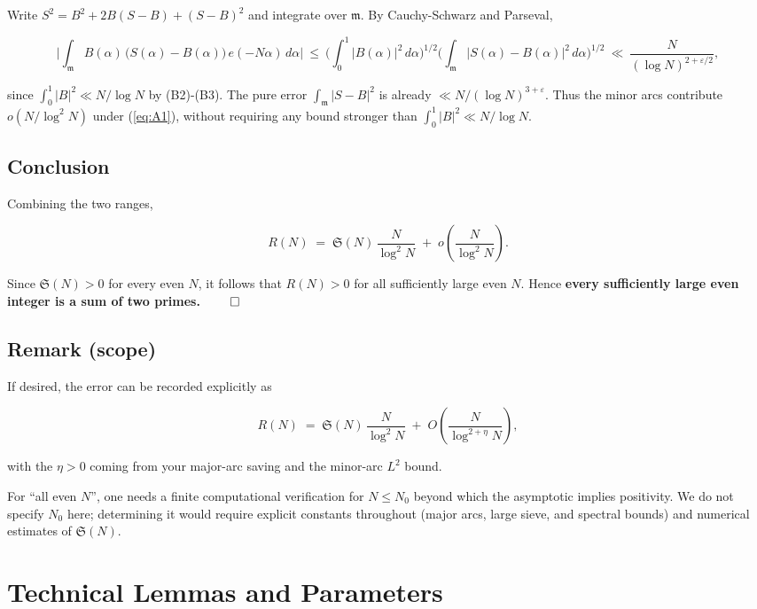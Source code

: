 \documentclass[11pt]{article}
\def\eqref#1{(\ref{#1})}%
\renewcommand{\thepart}{\Alph{part}}
\theoremstyle{definition}
\theoremstyle{remark}
\numberwithin{equation}{part}
\renewcommand{\thesection}{\thepart.\arabic{section}}
\begin{document}
Write $S^2=B^2+2B(S-B)+(S-B)^2$ and integrate over $\mathfrak m$.
By Cauchy-Schwarz and Parseval,

$$
	\Big|\int_{\mathfrak m} B(\alpha)\,\big(S(\alpha)-B(\alpha)\big)\,e(-N\alpha)\,d\alpha\Big|
	\ \le\ \Big(\int_0^1 |B(\alpha)|^2\,d\alpha\Big)^{1/2}
	\Big(\int_{\mathfrak m}|S(\alpha)-B(\alpha)|^2\,d\alpha\Big)^{1/2}
	\ \ll\ \frac{N}{(\log N)^{2+\varepsilon/2}},
$$

since $\int_0^1|B|^2\ll N/\log N$ by (B2)-(B3). The pure error $\int_{\mathfrak m}|S-B|^2$ is already $\ll N/(\log N)^{3+\varepsilon}$. Thus the minor arcs contribute $o\!\left(N/\log^2 N\right)$ under \eqref{eq:A1}, without requiring any bound stronger than $\int_0^1|B|^2\ll N/\log N$.

\subsection{Conclusion}

Combining the two ranges,

$$
	R(N)
	\;=\;\mathfrak S(N)\,\frac{N}{\log^2 N}\;+\;o\!\left(\frac{N}{\log^2 N}\right).
$$

Since $\mathfrak S(N)>0$ for every even $N$, it follows that $R(N)>0$ for all sufficiently large even $N$. Hence \textbf{every sufficiently large even integer is a sum of two primes.} $\qed$

\subsection{Remark (scope)}
If desired, the error can be recorded explicitly as

$$
	R(N)\;=\;\mathfrak S(N)\,\frac{N}{\log^2 N}\;+\;O\!\left(\frac{N}{\log^{2+\eta}N}\right),
$$

with the $\eta>0$ coming from your major-arc saving and the minor-arc $L^2$ bound.

For “all even $N$”, one needs a finite computational verification for $N\le N_0$ beyond which the asymptotic implies positivity. We do not specify $N_0$ here; determining it would require explicit constants throughout (major arcs, large sieve, and spectral bounds) and numerical estimates of $\mathfrak S(N)$.

\appendix
\renewcommand{\thesection}{Appendix~\Roman{section}}
\section{Technical Lemmas and Parameters}
\end{document}
